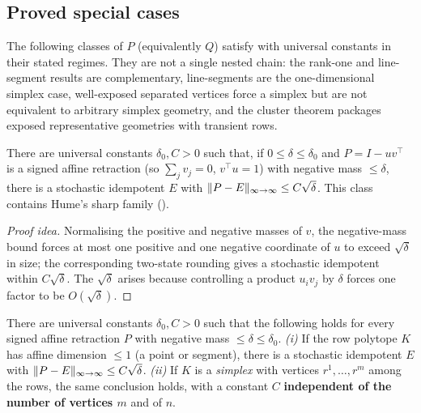 \subsection{Proved special cases}

The following classes of $P$ (equivalently $Q$) satisfy  with
universal constants in their stated regimes. They are not a single nested chain:
the rank-one and line-segment results are complementary, line-segments are the
one-dimensional simplex case, well-exposed separated vertices force a simplex
but are not equivalent to arbitrary simplex geometry, and the cluster theorem
packages exposed representative geometries with transient rows.

\begin{theorem}\label{thm:rank-one}
There are universal constants $\delta_0,C>0$ such that, if
$0\le\delta\le\delta_0$ and $P=I-uv^{\!\top}$ is a signed affine retraction
(so $\sum_j v_j=0$, $v^{\!\top}u=1$) with negative mass $\le\delta$, there is a
stochastic idempotent $E$ with
$\lVert P-E \rVert_{\infty\to\infty}\le C\sqrt\delta$. This class contains Hume's sharp
family ().
\end{theorem}

\begin{proof}[Proof idea]
Normalising the positive and negative masses of $v$, the negative-mass bound
forces at most one positive and one negative coordinate of $u$ to exceed
$\sqrt\delta$ in size; the corresponding two-state rounding gives a stochastic
idempotent within $C\sqrt\delta$. The $\sqrt\delta$ arises because controlling a
product $u_iv_j$ by $\delta$ forces one factor to be $O(\sqrt\delta)$.
\end{proof}

\begin{theorem}\label{thm:simplex}
There are universal constants $\delta_0,C>0$ such that the following holds for
every signed affine retraction $P$ with negative mass $\le\delta\le\delta_0$.
\emph{(i)} If the row polytope $K$ has affine dimension $\le1$ (a point or
segment), there is a stochastic idempotent $E$ with
$\lVert P-E \rVert_{\infty\to\infty}\le C\sqrt\delta$.
\emph{(ii)} If $K$ is a \emph{simplex} with vertices $r^1,\dots,r^m$ among the
rows, the same conclusion holds, with a constant $C$ \textbf{independent of the
number of vertices $m$} and of $n$.
\end{theorem}

